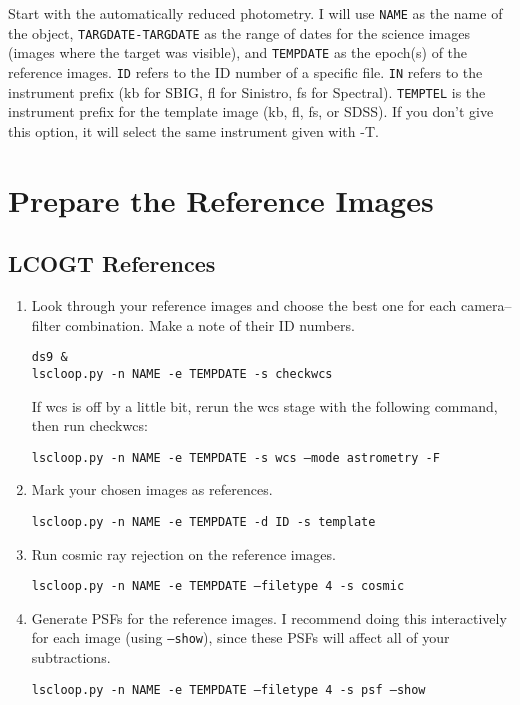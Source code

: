 Start with the automatically reduced photometry. I will use {\tt NAME} as the name of the object, {\tt TARGDATE-TARGDATE} as the range of dates for the science images (images where the target was visible), and {\tt TEMPDATE} as the epoch(s) of the reference images. {\tt ID} refers to the ID number of a specific file. {\tt IN} refers to the instrument prefix (kb for SBIG, fl for Sinistro, fs for Spectral). {\tt TEMPTEL} is the instrument prefix for the template image (kb, fl, fs, or SDSS). If you don't give this option, it will select the same instrument given with -T.

\section{Prepare the Reference Images}
\subsection{LCOGT References}
\begin{enumerate}

\item Look through your reference images and choose the best one for each camera--filter combination. Make a note of their ID numbers.

{\tt ds9 \& } \\
{\tt lscloop.py -n NAME -e TEMPDATE -s checkwcs}

If wcs is off by a little bit, rerun the wcs stage with the following command, then run checkwcs:

{\tt lscloop.py -n NAME -e TEMPDATE -s wcs --mode astrometry -F}

\item Mark your chosen images as references.

{\tt lscloop.py -n NAME -e TEMPDATE -d ID -s template}

\item Run cosmic ray rejection on the reference images.

{\tt lscloop.py -n NAME -e TEMPDATE --filetype 4 -s cosmic}

\item Generate PSFs for the reference images. I recommend doing this interactively for each image (using {\tt --show}), since these PSFs will affect all of your subtractions.

{\tt lscloop.py -n NAME -e TEMPDATE --filetype 4 -s psf --show}

\end{enumerate}

